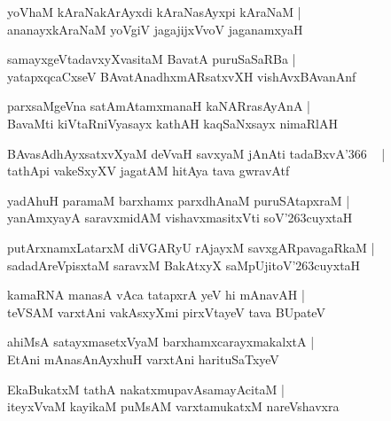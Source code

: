 \documentclass[twoside,12pt,openright]{book}
\def\S{\char'263}
\newcounter{shloka}[chapter]
\begin{document}
\begin{shloka}%
yoVhaM kAraNakArAyxdi kAraNasAyxpi kAraNaM |\\
ananayxkAraNaM yoVgiV jagajijxVvoV jaganamxyaH 
\end{shloka}

\begin{shloka}%
samayxgeVtadavxyXvasitaM BavatA puruSaSaRBa |\\
yatapxqcaCxseV BAvatAnadhxmARsatxvXH vishAvxBAvanAnf 
\end{shloka}

\begin{shloka}%
parxsaMgeVna satAmAtamxmanaH kaNARrasAyAnA |\\
BavaMti kiVtaRniVyasayx kathAH kaqSaNxsayx nimaRlAH 
\end{shloka}

\begin{shloka}%
BAvasAdhAyxsatxvXyaM deVvaH savxyaM jAnAti tadaBxvA\char'366 ~ |\\
tathApi vakeSxyXV jagatAM hitAya tava gwravAtf
\end{shloka}

\begin{shloka}%
yadAhuH paramaM barxhamx parxdhAnaM puruSAtapxraM |\\
yanAmxyayA saravxmidAM vishavxmasitxVti soV\S cuyxtaH
\end{shloka}

\begin{shloka}%
putArxnamxLatarxM diVGARyU rAjayxM savxgARpavagaRkaM |\\
sadadAreVpisxtaM saravxM BakAtxyX saMpUjitoV\S cuyxtaH
\end{shloka}

\begin{shloka}%
kamaRNA manasA vAca tatapxrA yeV hi mAnavAH |\\
teVSAM varxtAni vakAsxyXmi pirxVtayeV tava BUpateV 
\end{shloka}

\begin{shloka}%
ahiMsA satayxmasetxVyaM barxhamxcarayxmakalxtA |\\
EtAni mAnasAnAyxhuH varxtAni harituSaTxyeV
\end{shloka}

\begin{shloka}%
EkaBukatxM tathA nakatxmupavAsamayAcitaM |\\
iteyxVvaM kayikaM puMsAM varxtamukatxM nareVshavxra
\end{shloka}
\end{document}
